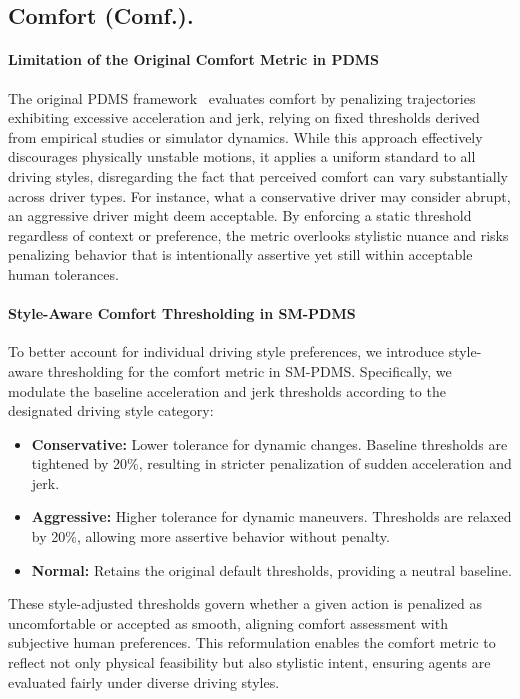 \documentclass{article}
\begin{document}
\subsection{Comfort (Comf.).}
\paragraph{Limitation of the Original Comfort Metric in PDMS}
The original PDMS framework~\cite{dauner2024navsim} evaluates comfort by penalizing trajectories exhibiting excessive acceleration and jerk, relying on fixed thresholds derived from empirical studies or simulator dynamics. While this approach effectively discourages physically unstable motions, it applies a uniform standard to all driving styles, disregarding the fact that perceived comfort can vary substantially across driver types. For instance, what a conservative driver may consider abrupt, an aggressive driver might deem acceptable. By enforcing a static threshold regardless of context or preference, the metric overlooks stylistic nuance and risks penalizing behavior that is intentionally assertive yet still within acceptable human tolerances.

\paragraph{Style-Aware Comfort Thresholding in SM-PDMS}
To better account for individual driving style preferences, we introduce style-aware thresholding for the comfort metric in SM-PDMS. Specifically, we modulate the baseline acceleration and jerk thresholds according to the designated driving style category:
\begin{itemize}[leftmargin=1em, topsep=0pt, itemsep=0.3em]
\item \textbf{Conservative:} Lower tolerance for dynamic changes. Baseline thresholds are tightened by 20\%, resulting in stricter penalization of sudden acceleration and jerk.
\item \textbf{Aggressive:} Higher tolerance for dynamic maneuvers. Thresholds are relaxed by 20\%, allowing more assertive behavior without penalty.
\item \textbf{Normal:} Retains the original default thresholds, providing a neutral baseline.
\end{itemize}

These style-adjusted thresholds govern whether a given action is penalized as uncomfortable or accepted as smooth, aligning comfort assessment with subjective human preferences. This reformulation enables the comfort metric to reflect not only physical feasibility but also stylistic intent, ensuring agents are evaluated fairly under diverse driving styles.
\end{document}

